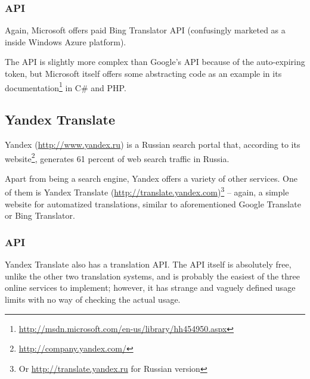 \subsubsection{API}
Again, Microsoft offers paid Bing Translator API (confusingly marketed as a  inside Windows Azure platform).

The API is slightly more complex than Google's API because of the auto-expiring token, but Microsoft itself offers some abstracting code as an example in its documentation\footnote{\url{http://msdn.microsoft.com/en-us/library/hh454950.aspx}} in C\# and PHP.


\subsection{Yandex Translate}
\label{yandex}
Yandex (\url{http://www.yandex.ru}) is a Russian search portal that, according to its website\footnote{\url{http://company.yandex.com/}}, generates 61 percent of web search traffic in Russia.

Apart from being a search engine, Yandex offers a variety of other services. One of them is Yandex Translate (\url{http://translate.yandex.com})\footnote{Or \url{http://translate.yandex.ru} for Russian version} -- again, a simple website for automatized translations, similar to aforementioned Google Translate or Bing Translator.


\subsubsection{API}
Yandex Translate also has a translation API. 
The API itself is absolutely free, unlike the other two translation systems, and is probably the easiest of the three online services to implement; however, it has strange and vaguely defined usage limits with no way of checking the actual usage.



